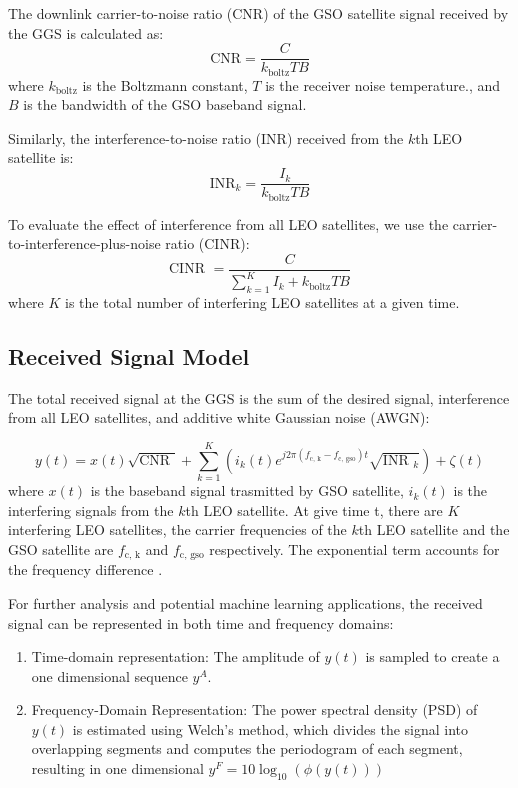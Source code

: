 \documentclass[12pt]{article}
\begin{document}
The downlink carrier-to-noise ratio (CNR) of the GSO satellite signal received by the GGS is calculated as:
$$
    \text{CNR} = \frac{C }{k_{\text{boltz}}TB}
$$
where $k_{\text{boltz}}$ is the Boltzmann constant, $T$ is the receiver noise temperature., and $B$ is the bandwidth of the GSO baseband signal.

Similarly,  the interference-to-noise ratio (INR) received from the $k$th LEO satellite is:
$$
    \text{INR}_k = \frac{I_k }{k_{\text{boltz}}TB}
$$

To evaluate the effect of interference from all LEO satellites, we use the carrier-to-interference-plus-noise ratio (CINR):
$$
    \text{CINR } = \frac{C }{\sum_{k=1}^{K }I_k + k_{\text{boltz}}TB}
$$
where $K$ is the total number of interfering LEO satellites at a given time.

\subsection{Received Signal Model}

The total received signal at the GGS is the sum of the desired signal, interference from all LEO satellites, and additive white Gaussian noise (AWGN):

$$
    y(t ) = x(t ) \sqrt{\text{CNR }} + \sum_{k=1}^{K } \left(i_{k}(t )e^{j 2 \pi (f_{\text{c, k}}- f_{\text{c, gso}})t} \sqrt{\text{INR }_{k}}\right) + \zeta(t)
$$
where $x(t)$ is the baseband signal trasmitted by GSO satellite, $i_{k}(t)$ is the interfering signals from the $k$th LEO satellite.
At give time t, there are $K$ interfering LEO satellites, the carrier frequencies of the $k $th LEO satellite and the GSO satellite are $f_{\text{c, k}}$ and $f_{\text{c, gso}}$ respectively. The exponential term accounts for the frequency difference .

For further analysis and potential machine learning applications, the received signal can be represented in both time and frequency domains:
\begin{enumerate}
    \item Time-domain representation: The amplitude of $y(t)$ is sampled to create a one dimensional sequence $y^{A}$.
    \item Frequency-Domain Representation: The power spectral density (PSD) of $y(t)$ is estimated using Welch's method, which divides the signal into overlapping segments and computes the periodogram of each segment, resulting in one dimensional $y^{F } = 10 \log_{10}(\phi(y(t )))$
\end{enumerate}
\end{document}
